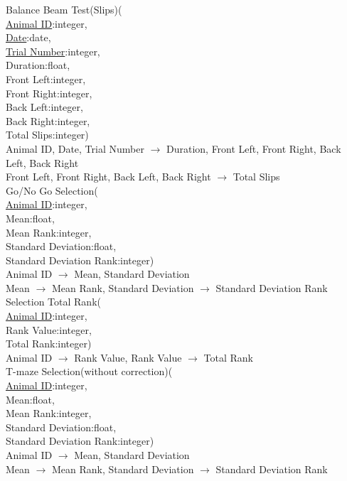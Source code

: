 \documentclass[12pt]{article}
\begin{document}
	\indent Balance Beam Test(Slips)(\\
	\indent\indent \underline{Animal ID}:integer,\\
	\indent\indent \underline{Date}:date,\\
	\indent\indent \underline{Trial Number}:integer,\\
	\indent\indent Duration:float,\\
	\indent\indent Front Left:integer,\\
	\indent\indent Front Right:integer,\\
	\indent\indent Back Left:integer,\\
	\indent\indent Back Right:integer,\\
	\indent\indent Total Slips:integer)\\
	\indent Animal ID, Date, Trial Number $\rightarrow$ Duration, Front Left, Front Right, Back Left, Back Right\\
	\indent Front Left, Front Right, Back Left, Back Right $\rightarrow$ Total Slips\\
	
	\indent Go/No Go Selection(\\
	\indent\indent \underline{Animal ID}:integer,\\
	\indent\indent Mean:float,\\
	\indent\indent Mean Rank:integer,\\
	\indent\indent Standard Deviation:float,\\
	\indent\indent Standard Deviation Rank:integer)\\
	\indent Animal ID $\rightarrow$ Mean, Standard Deviation\\
	\indent Mean $\rightarrow$ Mean Rank, Standard Deviation $\rightarrow$ Standard Deviation Rank\\ 
	
	\indent Selection Total Rank(\\
	\indent\indent \underline{Animal ID}:integer,\\
	\indent\indent Rank Value:integer,\\
	\indent\indent Total Rank:integer)\\
	\indent Animal ID $\rightarrow$ Rank Value, Rank Value $\rightarrow$ Total Rank\\
	
	\indent T-maze Selection(without correction)(\\
	\indent\indent \underline{Animal ID}:integer,\\
	\indent\indent Mean:float,\\
	\indent\indent Mean Rank:integer,\\
	\indent\indent Standard Deviation:float,\\
	\indent\indent Standard Deviation Rank:integer)\\
	\indent Animal ID $\rightarrow$ Mean, Standard Deviation\\
	\indent Mean $\rightarrow$ Mean Rank, Standard Deviation $\rightarrow$ Standard Deviation Rank\\
	
\end{document}
